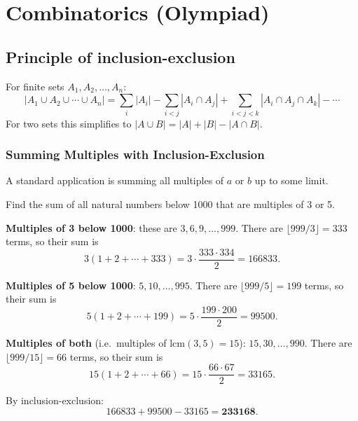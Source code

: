 
\section{Combinatorics (Olympiad)}

\subsection{Principle of inclusion-exclusion}

\begin{theorem}
For finite sets $A_1, A_2, \ldots, A_n$:
\[
\left|A_1 \cup A_2 \cup \cdots \cup A_n\right|
= \sum_i |A_i| - \sum_{i<j}|A_i \cap A_j| + \sum_{i<j<k}|A_i \cap A_j \cap A_k| - \cdots
\]
For two sets this simplifies to $|A \cup B| = |A| + |B| - |A \cap B|$.
\end{theorem}

\subsubsection*{Summing Multiples with Inclusion-Exclusion}

A standard application is summing all multiples of $a$ or $b$ up to some limit.

\begin{example}
Find the sum of all natural numbers below 1000 that are multiples of 3 or 5.

\textbf{Multiples of 3 below 1000}: these are $3, 6, 9, \ldots, 999$. There are $\lfloor 999/3 \rfloor = 333$ terms, so their sum is
\[
3(1+2+\cdots+333) = 3 \cdot \frac{333 \cdot 334}{2} = 166833.
\]

\textbf{Multiples of 5 below 1000}: $5, 10, \ldots, 995$. There are $\lfloor 999/5 \rfloor = 199$ terms, so their sum is
\[
5(1+2+\cdots+199) = 5 \cdot \frac{199 \cdot 200}{2} = 99500.
\]

\textbf{Multiples of both} (i.e.\ multiples of $\text{lcm}(3,5)=15$): $15, 30, \ldots, 990$. There are $\lfloor 999/15 \rfloor = 66$ terms, so their sum is
\[
15(1+2+\cdots+66) = 15 \cdot \frac{66 \cdot 67}{2} = 33165.
\]

By inclusion-exclusion:
\[
166833 + 99500 - 33165 = \mathbf{233168}.
\]
\end{example}

